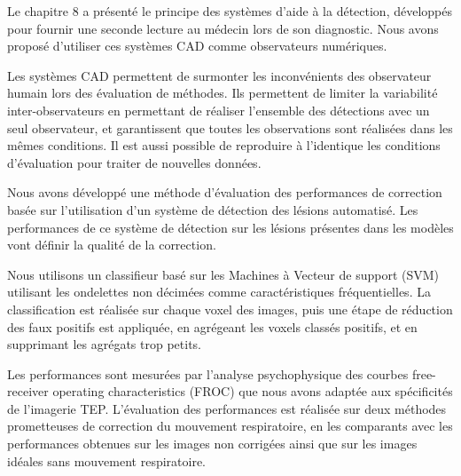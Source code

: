 Le chapitre 8 a présenté le principe des systèmes d'aide à la détection, développés pour fournir une seconde lecture au médecin lors de son diagnostic. Nous avons proposé d'utiliser ces systèmes CAD comme observateurs numériques.

Les systèmes CAD permettent de surmonter les inconvénients des observateur humain lors des évaluation de méthodes. Ils permettent de limiter la variabilité inter-observateurs en permettant de réaliser l'ensemble des détections avec un seul observateur, et garantissent que toutes les observations sont réalisées dans les mêmes conditions. Il est aussi possible de reproduire à l'identique les conditions d'évaluation pour traiter de nouvelles données.

Nous avons développé une méthode d'évaluation des performances de correction basée sur l'utilisation d'un système de détection des lésions automatisé. Les performances de ce système de détection sur les lésions présentes dans les modèles vont définir la qualité de la correction. 

Nous utilisons un classifieur basé sur les Machines à Vecteur de support (SVM) utilisant les ondelettes non décimées comme caractéristiques fréquentielles. La classification est réalisée sur chaque voxel des images, puis une étape de réduction des faux positifs est appliquée, en agrégeant les voxels classés positifs, et en supprimant les agrégats trop petits.

Les performances sont mesurées par l’analyse psychophysique des courbes free-receiver operating characteristics (FROC) que nous avons adaptée aux spécificités de l’imagerie TEP. L’évaluation des performances est réalisée sur deux méthodes prometteuses de correction du mouvement respiratoire, en les comparants avec les performances obtenues sur les images non corrigées ainsi que sur les images idéales sans mouvement respiratoire.
